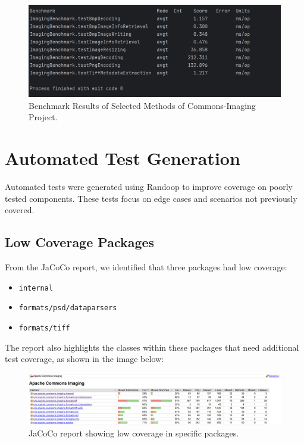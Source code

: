 \documentclass[a4paper,12pt]{report}
\begin{document}
\begin{figure}[H]
    \centering
    \includegraphics[width=1\textwidth]{Report_Img/benchmark.png}
    \caption{Benchmark Results of Selected Methods of Commons-Imaging Project.}
    \label{fig:benchmark_result}
\end{figure}

\newpage


\chapter{Automated Test Generation}
Automated tests were generated using Randoop to improve coverage on poorly tested components. These tests focus on edge cases and scenarios not previously covered.

\section{Low Coverage Packages}
From the JaCoCo report, we identified that three packages had low coverage: 
\begin{itemize}
    \item \texttt{internal}
    \item \texttt{formats/psd/dataparsers}
    \item \texttt{formats/tiff}
\end{itemize}
The report also highlights the classes within these packages that need additional test coverage, as shown in the image below:
\begin{figure}[H]
    \centering
    \includegraphics[width=1\textwidth]{Report_Img/auto_gen_init.png}
    \caption{JaCoCo report showing low coverage in specific packages.}
    \label{fig:jacoco-report}
\end{figure}
\end{document}
